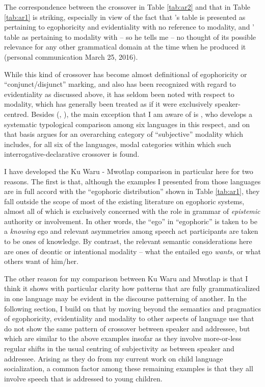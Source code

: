 \documentclass[output=paper]{langsci/langscibook}
\begin{document}

The correspondence between the crossover in Table \ref{tab:ar2} and that in Table \ref{tab:ar1} is striking, especially in view of the fact that \citeauthor{SanRoqueSchieffelin2018}’s table is presented as pertaining to egophoricity and evidentiality with no reference to modality, and \citeauthor{Francois2003}’ table as pertaining to modality with – so he tells me – no thought of its possible relevance for any other grammatical domain at the time when he produced it (personal communication March 25, 2016). 

While this kind of crossover has become almost definitional of egophoricity or “conjunct/disjunct” marking, and also has been recognized with regard to evidentiality as discussed above, it has seldom been noted with respect to modality, which has generally been treated as if it were exclusively speaker-centred. Besides \citeauthor{Francois2003} (\citeyear{Francois2003}, \citeyear{Francois2004}), the main exception that I am aware of is \cite{Lehmann2012}, who develops a systematic typological comparison among six languages in this respect, and on that basis argues for an overarching category of “subjective” modality which includes, for all six of the languages, modal categories within which such interrogative-declarative crossover is found.

I have developed the Ku Waru - Mwotlap comparison in particular here for two reasons.  The first is that, although the examples I presented from those languages are in full accord with the “egophoric distribution” shown in Table \ref{tab:ar1}, they fall outside the scope of most of the existing literature on egophoric systems, almost all of which is exclusively concerned with the role in grammar of \textit{epistemic} authority or involvement. In other words, the “ego” in “egophoric” is taken to be a \textit{knowing} ego and relevant asymmetries among speech act participants are taken to be ones of knowledge. By contrast, the relevant semantic considerations here are ones of deontic or intentional modality – what the entailed ego \textit{wants}, or what others want of him/her. 

The other reason for my comparison between Ku Waru and Mwotlap is that I think it shows with particular clarity how patterns that are fully grammaticalized in one language may be evident in the discourse patterning of another. In the following section, I build on that by moving beyond the semantics and pragmatics of egophoricity, evidentiality and modality to other aspects of language use that do not show the same pattern of crossover between speaker and addressee, but which are similar to the above examples insofar as they involve more-or-less regular shifts in the usual centring of subjectivity as between speaker and addressee.  Arising as they do from my current work on child language socialization, a common factor among these remaining examples is that they all involve speech that is addressed to young children.
\end{document}
